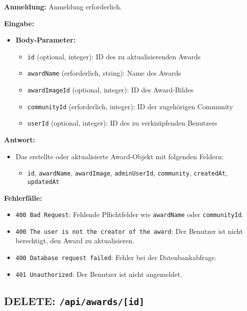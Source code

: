 \documentclass[a4paper,12pt]{article}
\begin{document}
\textbf{Anmeldung:} Anmeldung erforderlich.

\textbf{Eingabe:}
\begin{itemize}
    \item \textbf{Body-Parameter:}
    \begin{itemize}
        \item \texttt{id} (optional, integer):
            ID des zu aktualisierenden Awards
        \item \texttt{awardName} (erforderlich, string):
            Name des Awards
        \item \texttt{awardImageId} (optional, integer):
            ID des Award-Bildes
        \item \texttt{communityId} (erforderlich, integer):
            ID der zugehörigen Community
        \item \texttt{userId} (optional, integer):
            ID des zu verknüpfenden Benutzers
    \end{itemize}
\end{itemize}

\textbf{Antwort:}
\begin{itemize}
    \item Das erstellte oder aktualisierte Award-Objekt mit folgenden Feldern:
    \begin{itemize}
        \item \texttt{id},
              \texttt{awardName},
              \texttt{awardImage},
              \texttt{adminUserId},
              \texttt{community},
              \texttt{createdAt},
              \texttt{updatedAt}
    \end{itemize}
\end{itemize}

\textbf{Fehlerfälle:}
\begin{itemize}
    \item \texttt{400 Bad Request}:
        Fehlende Pflichtfelder wie \texttt{awardName} oder
        \texttt{communityId}.
    \item \texttt{400 The user is not the creator of the award}:
        Der Benutzer ist nicht berechtigt, den Award zu aktualisieren.
    \item \texttt{400 Database request failed}:
        Fehler bei der Datenbankabfrage.
    \item \texttt{401 Unauthorized}:
        Der Benutzer ist nicht angemeldet.
\end{itemize}

\newpage
\subsection{DELETE: \texttt{/api/awards/[id]}}
\end{document}
